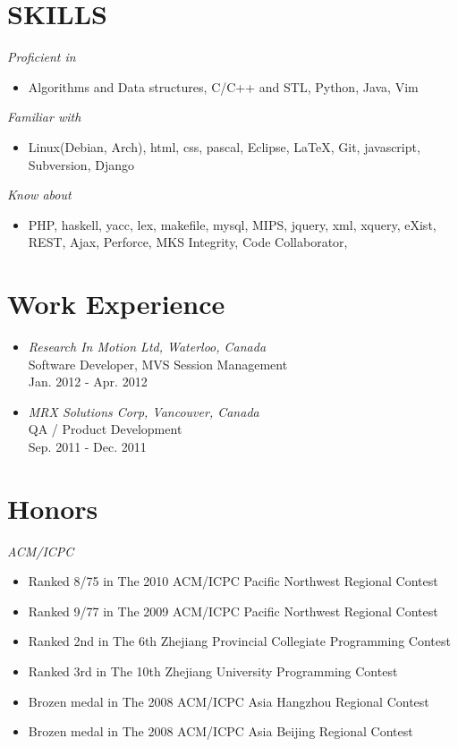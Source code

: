 \documentclass[line,margin]{res}
\begin{document}
\address{909-16 Cedarwoods Cres. Kitchener, ON, Canada  N2C 2L4}
\address{+1-778-862-3661 \\ zmin@sfu.ca}
\begin{resume}
\section{SKILLS} 
	{\sl Proficient in } 
						\begin{itemize}
						\item Algorithms and Data structures, C/C++ and STL, Python, Java, Vim
						\end{itemize}
    {\sl Familiar with }
						\begin{itemize}
						\item Linux(Debian, Arch), html, css, pascal, Eclipse, \LaTeX, Git, javascript, Subversion, Django
						\end{itemize}
 	{\sl Know about } 
					\begin{itemize}
					\item PHP, haskell, yacc, lex, makefile, mysql, MIPS, jquery, xml, xquery, eXist, REST, Ajax, Perforce, MKS Integrity, Code Collaborator, 
					\end{itemize}

\section{Work Experience}
\begin{itemize}
\item {\sl Research In Motion Ltd, Waterloo, Canada}\\
 Software Developer, MVS Session Management \\
Jan. 2012 - Apr. 2012
\item {\sl MRX Solutions Corp, Vancouver, Canada}\\
 QA / Product Development \\
Sep. 2011 - Dec. 2011
\end{itemize}


\section{Honors}
{\sl ACM/ICPC}
\begin{itemize}
\item Ranked 8/75 in The 2010 ACM/ICPC Pacific Northwest Regional Contest	
\item Ranked 9/77 in The 2009 ACM/ICPC Pacific Northwest Regional Contest	
\item Ranked 2nd in The 6th Zhejiang Provincial Collegiate Programming Contest 
\item Ranked 3rd in The 10th Zhejiang University Programming Contest 
\item Brozen medal in The 2008 ACM/ICPC Asia Hangzhou Regional Contest 
\item Brozen medal in The 2008 ACM/ICPC Asia Beijing Regional Contest   


\end{itemize}
\end{resume}
\end{document}
